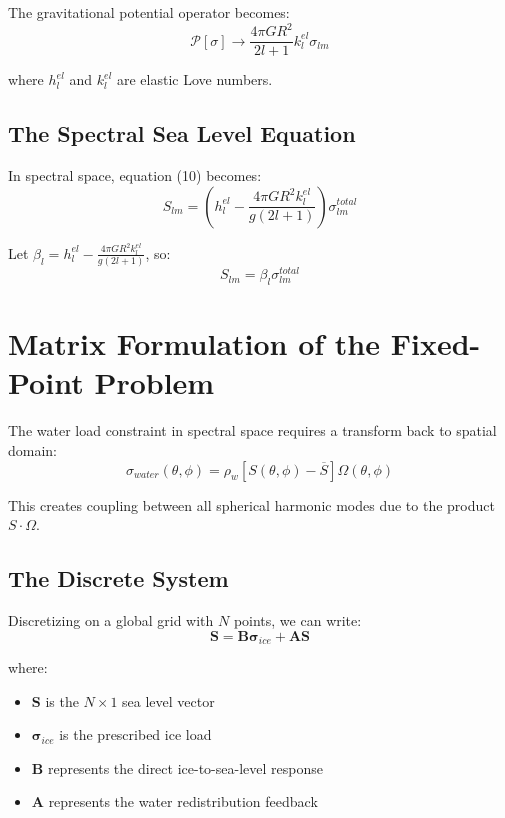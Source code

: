 \documentclass{article}
\begin{document}
The gravitational potential operator becomes:
\begin{equation}
\mathcal{P}[\sigma] \rightarrow \frac{4\pi G R^2}{2l+1} k_l^{el} \sigma_{lm}
\end{equation}

where $h_l^{el}$ and $k_l^{el}$ are elastic Love numbers.

\subsection{The Spectral Sea Level Equation}
In spectral space, equation (10) becomes:
\begin{equation}
S_{lm} = \left(h_l^{el} - \frac{4\pi G R^2 k_l^{el}}{g(2l+1)}\right) \sigma_{lm}^{total}
\end{equation}

Let $\beta_l = h_l^{el} - \frac{4\pi G R^2 k_l^{el}}{g(2l+1)}$, so:
\begin{equation}
S_{lm} = \beta_l \sigma_{lm}^{total}
\end{equation}

\section{Matrix Formulation of the Fixed-Point Problem}

The water load constraint in spectral space requires a transform back to spatial domain:
\begin{equation}
\sigma_{water}(\theta, \phi) = \rho_w [S(\theta, \phi) - \overline{S}] \Omega(\theta, \phi)
\end{equation}

This creates coupling between all spherical harmonic modes due to the product $S \cdot \Omega$.

\subsection{The Discrete System}
Discretizing on a global grid with $N$ points, we can write:
\begin{equation}
\mathbf{S} = \mathbf{B} \boldsymbol{\sigma}_{ice} + \mathbf{A} \mathbf{S}
\end{equation}

where:
\begin{itemize}
\item $\mathbf{S}$ is the $N \times 1$ sea level vector
\item $\boldsymbol{\sigma}_{ice}$ is the prescribed ice load
\item $\mathbf{B}$ represents the direct ice-to-sea-level response
\item $\mathbf{A}$ represents the water redistribution feedback
\end{itemize}
\end{document}
